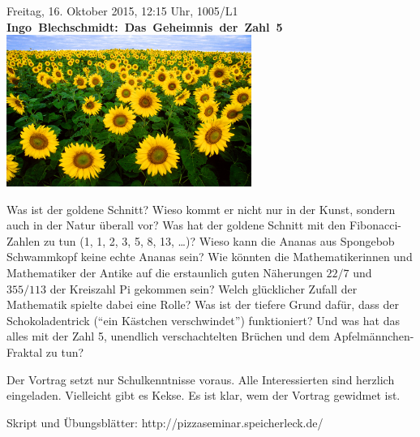 \documentclass[a4paper,ngerman,landscape]{scrartcl}
\begin{document}
\begin{center}
  \Huge
  \vspace*{0.0em}
  Freitag, 16. Oktober 2015, 12:15 Uhr, 1005/L1 \\
  \mbox{\textbf{Ingo Blechschmidt: Das Geheimnis der Zahl 5}}
  \vfill
  \vspace{0.3em}
  \includegraphics[width=0.6\textwidth]{sonnenblumen}
  \vfill

  \Large
  \begin{minipage}{0.92\textwidth}
    \setlength\parskip{\medskipamount}
    \vspace{0.3em}
    Was ist der goldene Schnitt? Wieso kommt er nicht nur in der Kunst, sondern
    auch in der Natur überall vor? Was hat der goldene Schnitt mit den
    Fibonacci-Zahlen zu tun (1, 1, 2, 3, 5, 8, 13, \ldots)? Wieso kann die Ananas
    aus Spongebob Schwammkopf keine echte Ananas sein? Wie könnten die
    Mathematikerinnen und Mathematiker der Antike auf die erstaunlich guten
    Näherungen $22/7$ und $355/113$ der Kreiszahl Pi gekommen sein? Welch
    glücklicher Zufall der Mathematik spielte dabei eine Rolle? Was ist der
    tiefere Grund dafür, dass der Schokoladentrick ("`ein Kästchen
    verschwindet"') funktioniert? Und was hat das alles mit der Zahl 5,
    unendlich verschachtelten Brüchen und dem Apfelmännchen-Fraktal zu tun?

    Der Vortrag setzt nur Schulkenntnisse voraus. Alle Interessierten sind
    herzlich eingeladen. Vielleicht gibt es Kekse. Es ist klar, wem der Vortrag
    gewidmet ist.

    \vspace{0.3em}
    \hfill\small Skript und Übungsblätter: \textsf{http:/$\!$/pizzaseminar.speicherleck.de/}
  \end{minipage}
\end{center}
\end{document}
